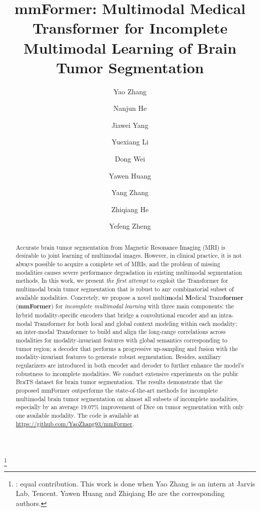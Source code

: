 \documentclass[runningheads]{llncs}
\begin{document}
\title{mmFormer: Multimodal Medical Transformer for Incomplete Multimodal Learning of Brain Tumor Segmentation}
\author{
Yao Zhang \and
Nanjun He \and
Jiawei Yang \and
Yuexiang Li \and
Dong Wei \and
Yawen Huang\Letter \and
Yang Zhang \and
Zhiqiang He\Letter \and
Yefeng Zheng
}
\renewcommand{\thefootnote}{}
\maketitle              

\footnote{: equal contribution. This work is done when Yao Zhang is an intern at Jarvis Lab, Tencent. Yawen Huang and Zhiqiang He are the corresponding authors.}

\begin{abstract}
Accurate brain tumor segmentation from Magnetic Resonance Imaging (MRI) is desirable to joint learning of multimodal images. However, in clinical practice, it is not always possible to acquire a complete set of MRIs, and the problem of missing modalities causes severe performance degradation in existing multimodal segmentation methods. In this work, we present \textit{the first attempt} to exploit the Transformer for multimodal brain tumor segmentation that is robust to any combinatorial subset of available modalities. Concretely, we propose a novel multi\textbf{m}odal \textbf{M}edical Trans\textbf{former} (\textbf{mmFormer}) for \textit{incomplete multimodal learning} with three main components: the hybrid modality-specific encoders that bridge a convolutional encoder and an intra-modal Transformer for both local and global context modeling within each modality; an inter-modal Transformer to build and align the long-range correlations across modalities for modality-invariant features with global semantics corresponding to tumor region; a decoder that performs a progressive up-sampling and fusion with the modality-invariant features to generate robust segmentation. Besides, auxiliary regularizers are introduced in both encoder and decoder to further enhance the model's robustness to incomplete modalities. We conduct extensive experiments on the public BraTS  dataset for brain tumor segmentation. The results demonstrate that the proposed mmFormer outperforms the state-of-the-art methods for incomplete multimodal brain tumor segmentation on almost all subsets of incomplete modalities, especially by an average 19.07\% improvement of Dice on tumor segmentation with only one available modality. The code is available at \href{https://github.com/YaoZhang93/mmFormer}{https://github.com/YaoZhang93/mmFormer}.

\end{abstract}
\end{document}
